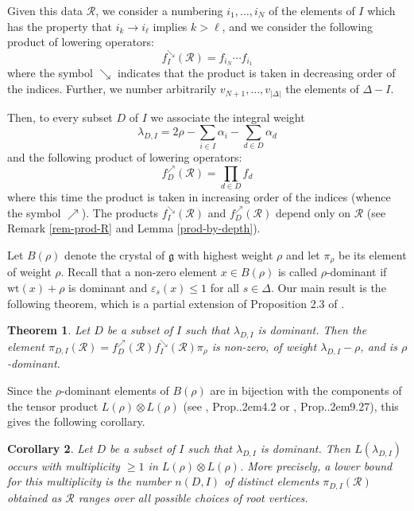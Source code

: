 \documentclass[12pt]{amsart}
\numberwithin{equation}{section}
\newtheorem{thm}{Theorem}[section]
\newtheorem{cor}[thm]{Corollary}
\theoremstyle{definition}
\def\Prop{Prop.\kern.2em}
\def\calR{\mathcal{R}} %
\def\wt{\mathrm{wt}}  %
\let\vep\varepsilon
\def\sea{{\scriptscriptstyle\searrow}}
\def\nea{{\scriptscriptstyle\nearrow}}
\begin{document}
Given this data $\calR$, we consider a numbering $i_1,\dots, i_N$ of the elements of $I$ 
which has the property that $i_k \to i_\ell$ implies $k > \ell$, and we consider the following 
product of lowering operators:  
\begin{equation} 
f_I^\sea (\calR) = f_{i_N} \cdots f_{i_1} 
\end{equation} 
where the symbol $\sea$ indicates that the product is taken in decreasing order of the indices. Further, we number arbitrarily $v_{N+1}, \dots, v_{\vert \Delta\vert}$ 
the elements of $\Delta - I$. 


Then, to every subset $D$ of $I$ we associate the integral weight 
\begin{equation} 
\lambda_{D,I} = 2\rho - \sum_{i\in I} \alpha_i - \sum_{d\in D} \alpha_d 
\end{equation} 
and the following product of lowering operators:  
\begin{equation} 
f_D^\nea (\calR) = \prod_{d\in D} f_d 
\end{equation} 
where this time the product is taken in increasing order of the indices (whence the symbol $\nea$). 
The products $f_I^\sea (\calR)$ and $f_D^\nea (\calR)$ depend only on $\calR$ 
(see Remark \ref{rem-prod-R} and Lemma \ref{prod-by-depth}). 

Let $B(\rho)$ denote the crystal of $\mathfrak{g}$ with highest weight $\rho$ and let $\pi_\rho$ be its element of 
weight $\rho$. Recall that a non-zero element $x\in B(\rho)$ is called $\rho$-dominant if 
$\wt(x) + \rho$ is dominant and $\vep_s(x) \leq 1$ for all $s\in \Delta$. 
Our main result is the following theorem,  which is a partial extension of Proposition 2.3 of \cite{BG25}. 

\begin{thm}\label{th-1} Let $D$ be a subset of $I$ such that $\lambda_{D, I}$ is dominant. 
Then the element 
$\pi_{D, I}(\calR) = f_D^\nea (\calR) f_I^\sea (\calR) \pi_\rho$ 
is non-zero, of weight $\lambda_{D,I} - \rho$, and is $\rho$-dominant. 
\end{thm} 

Since the $\rho$-dominant elements of $B(\rho)$ are in bijection with the components of the tensor product 
$L(\rho) \otimes L(\rho)$ (see \cite{Ka95}, \Prop 4.2 or \cite{Ja96}, \Prop 9.27), this gives the following corollary. 

\begin{cor}\label{cor-1} Let $D$ be a subset of $I$ such that $\lambda_{D, I}$ is dominant. 
Then $L(\lambda_{D,I})$ occurs with multiplicity $\geq 1$ in $L(\rho)\otimes L(\rho)$. More precisely, 
a lower bound for this multiplicity is the number 
$n(D,I)$ of distinct elements $\pi_{D, I}(\calR)$ obtained as $\calR$ ranges over all possible choices 
of root vertices. 
\end{cor} 
\end{document}
